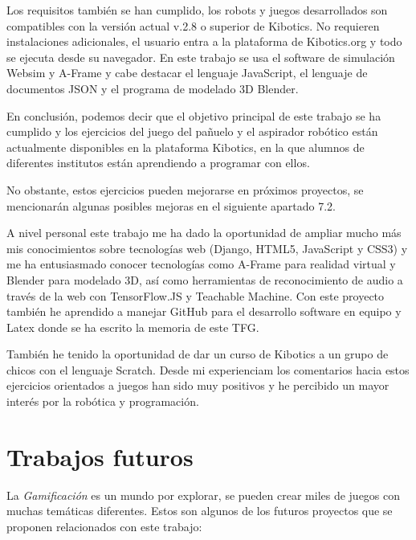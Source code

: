 Los requisitos  también se han cumplido, los robots y juegos desarrollados son compatibles con la versión actual v.2.8 o superior de Kibotics. No requieren instalaciones adicionales, el usuario entra a la plataforma de Kibotics.org y todo se ejecuta desde su navegador.  En este trabajo se usa el software de simulación Websim y A-Frame y cabe destacar el lenguaje JavaScript, el lenguaje de documentos JSON y el programa de modelado 3D Blender.

En conclusión,  podemos decir que el objetivo principal de este trabajo se ha cumplido y los ejercicios del juego del pañuelo y el aspirador robótico están actualmente disponibles en la plataforma Kibotics, en la que alumnos de diferentes institutos están aprendiendo a programar con ellos.

No obstante, estos ejercicios pueden mejorarse en próximos proyectos, se mencionarán algunas posibles mejoras en el siguiente apartado 7.2.

A nivel personal este trabajo me ha dado la oportunidad de ampliar mucho más mis conocimientos sobre tecnologías web (Django, HTML5, JavaScript y CSS3) y me ha entusiasmado conocer tecnologías como A-Frame para realidad virtual y Blender para modelado 3D, así como herramientas de reconocimiento de audio a través de la web con TensorFlow.JS y Teachable Machine.
Con este proyecto también he aprendido a manejar GitHub para el desarrollo software en equipo y Latex donde se ha escrito la memoria de este TFG.

También he tenido la oportunidad de dar un curso de Kibotics a un grupo de chicos con el lenguaje Scratch. Desde mi experienciam los comentarios hacia estos ejercicios orientados a juegos han sido muy positivos y he percibido un mayor interés por la robótica y programación.

    
\section{Trabajos futuros}

La \textit{Gamificación} es un mundo por explorar, se pueden crear miles de juegos con muchas temáticas diferentes. Estos son algunos de los futuros proyectos que se proponen relacionados con este trabajo:

